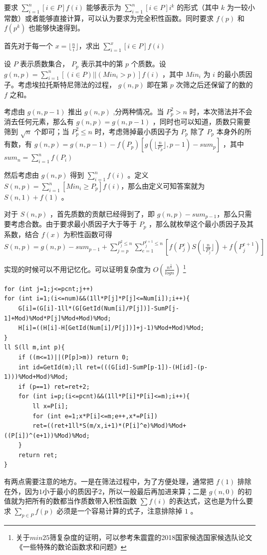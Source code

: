 \documentclass[UTF-8]{ctexart}
\begin{document}
	要求 $\sum _ {i=1}^n [i \in P]f(i)$ 能够表示为 $\sum _ {i=1}^ n[i \in P] i^k$ 的形式（其中 $k$ 为一较小常数）或者能够直接计算，可以认为要求为完全积性函数。同时要求 $f(p)$ 和 $f(p^k)$ 也能够快速得到。 
	
	首先对于每一个 $x=\lfloor \frac{n}{i} \rfloor $，求出 $\sum _ {i=1} ^ x [i \in P]f(i)$
	
	设 $P$ 表示质数集合， $P_p$ 表示其中的第 $p$ 个质数。设 $g(n,p)=\sum_{i=1}^n[(i \in P)||(Min_i>p)]f(i)$ ，其中 $Min_i$ 为 $i$ 的最小质因子。考虑埃拉托斯特尼筛法的过程， $g(n,p)$ 即在第 $p$ 次筛之后还保留了的数的 $f$ 之和。
	
	考虑由 $g(n,p-1)$ 推出 $g(n,p)$ ,分两种情况。当 $P_p^2>n$ 时，本次筛法并不会消去任何元素，那么有 $g(n,p)=g(n,p-1)$ ，同时也可以知道，质数只需要筛到 $\sqrt{n}$ 个即可；当 $P _ p ^ 2 \leq n$ 时，考虑筛掉最小质因子为 $P_p$ 除了 $P_p$ 本身外的所有数，有 $g(n,p)=g(n,p-1)-f(P_p)[g(\lfloor \frac{n}{P_p} \rfloor,p-1)-sum_p]$ ，其中 $sum_n=\sum_{i=1}^n f(P_i)$
	
	然后考虑由 $g(n,p)$ 得到 $\sum_{i=1}^n f(i)$ 。定义 $S(n,p)=\sum_{i=1}^n [Min_i \ge P_p]f(i)$，那么由定义可知答案就为 $S(n,1)+f(1)$ 。
	
	对于 $S(n,p)$ ，首先质数的贡献已经得到了，即 $g(n,p)-sum_{p-1}$，那么只需要考虑合数。由于要求最小质因子大于等于 $P_p$ ，那么就枚举这个最小质因子及其系数，结合 $f(x)$ 为积性函数可得 $S(n,p)=g(n,p)-sum_{p-1}+\sum_{j=p}^{P_j^2\le n}\sum_{e=1}^{P_j^{e+1}\le n}[f(P_j^e)S(\lfloor \frac{n}{P_j^e}\rfloor)+f(P_j^{e+1})]$ 
	
	实现的时候可以不用记忆化。可以证明复杂度为 $O(\frac{n^{\frac{3}{4}}}{logn})$ \footnote{关于$min25$筛复杂度的证明，可以参考朱震霆的2018国家候选国家候选队论文《一些特殊的数论函数求和问题》}
\begin{verbatim}
for (int j=1;j<=pcnt;j++)
for (int i=1;(i<=num)&&(1ll*P[j]*P[j]<=Num[i]);i++){
    G[i]=(G[i]-1ll*(G[GetId(Num[i]/P[j])]-SumP[j-1]+Mod)%Mod*P[j]%Mod+Mod)%Mod;
    H[i]=((H[i]-H[GetId(Num[i]/P[j])]+j-1)%Mod+Mod)%Mod;
}
ll S(ll m,int p){
    if ((m<=1)||(P[p]>m)) return 0;
    int id=GetId(m);ll ret=(((G[id]-SumP[p-1])-(H[id]-(p-1)))%Mod+Mod)%Mod;
    if (p==1) ret=ret+2;
    for (int i=p;(i<=pcnt)&&(1ll*P[i]*P[i]<=m);i++){
        ll x=P[i];
        for (int e=1;x*P[i]<=m;e++,x*=P[i])
        ret=((ret+1ll*S(m/x,i+1)*(P[i]^e)%Mod)%Mod+((P[i])^(e+1))%Mod)%Mod;
    }
    return ret;
}
\end{verbatim}

	有两点需要注意的地方。一是在筛法过程中，为了方便处理，通常把 $f(1)$ 排除在外，因为$1$小于最小的质因子$2$，所以一般最后再加进来算；二是 $g(n,0)$ 的初值就为把所有的数都当作质数带入积性函数 $\sum f(i)$ 的表达式，这也是为什么要求 $\sum_{p \in P}f(p)$ 必须是一个容易计算的式子，注意排除掉 $1$ 。
	
\end{document}
